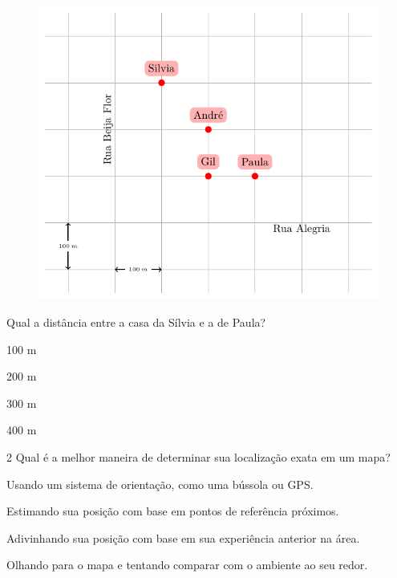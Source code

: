 \begin{figure}[htpb!]
\centering
\includegraphics[width=\textwidth]{./tikz/030.pdf}
\end{figure}

Qual a distância entre a casa da Sílvia e a de Paula?

\begin{escolha}

  \item 100 m

  \item 200 m

  \item 300 m

  \item 400 m

\end{escolha}

\pagebreak
\num{2} Qual é a melhor maneira de determinar sua localização exata em um
mapa? 

\begin{escolha}

  \item Usando um sistema de orientação, como uma bússola ou GPS. 

  \item Estimando sua posição com base em pontos de referência próximos. 

  \item Adivinhando sua posição com base em sua experiência anterior na área. 

  \item Olhando para o mapa e tentando comparar com o ambiente ao seu redor.

\end{escolha}

